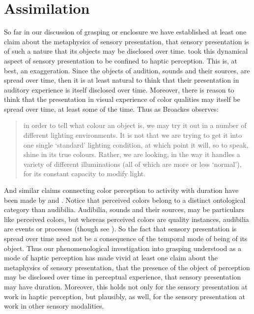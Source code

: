 \section{Assimilation} %
\label{sec:assimilation}

So far in our discussion of grasping or enclosure we have established at least one claim about the metaphysics of sensory presentation, that sensory presentation is of such a nature that its objects may be disclosed over time. \citet{Broad:1952kx} took this dynamical aspect of sensory presentation to be confined to haptic perception. This is, at best, an exaggeration. Since the objects of audition, sounds and their sources, are spread over time, then it is at least natural to think that their presentation in auditory experience is itself disclosed over time. Moreover, there is reason to think that the presentation in visual experience of color qualities may itself be spread over time, at least some of the time. Thus as Broackes observes: 
\begin{quote}
	in order to tell what colour an object is, we may try it out in a number of different lighting environments. It is not that we are trying to get it into one single `standard' lighting condition, at which point it will, so to speak, shine in its true colours. Rather, we are looking, in the way it handles a variety of different illuminations (all of which are more or less `normal'), for its constant capacity to modify light. \citep[215]{Broackes:1997pa}
\end{quote}
And similar claims connecting color perception to activity with duration have been made by \citet{Noe:2004fk} and \citet{Matthen:2005md}. Notice that perceived colors belong to a distinct ontological category than audibilia. Audibilia, sounds and their sources, may be particulars like perceived colors, but whereas perceived colors are quality instances, audibilia are events or processes (though see \citealt{Pasnau:2009ys}). So the fact that sensory presentation is spread over time need not be a consequence of the temporal mode of being of its object. Thus our phenomenological investigation into grasping understood as a mode of haptic perception has made vivid at least one claim about the metaphysics of sensory presentation, that the presence of the object of perception may be disclosed over time in perceptual experience, that sensory presentation may have duration. Moreover, this holds not only for the sensory presentation at work in haptic perception, but plausibly, as well, for the sensory presentation at work in other sensory modalities.

